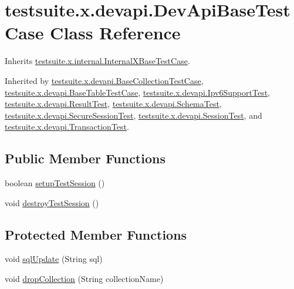 \hypertarget{classtestsuite_1_1x_1_1devapi_1_1_dev_api_base_test_case}{}\section{testsuite.\+x.\+devapi.\+Dev\+Api\+Base\+Test\+Case Class Reference}
\label{classtestsuite_1_1x_1_1devapi_1_1_dev_api_base_test_case}


Inherits \mbox{\hyperlink{classtestsuite_1_1x_1_1internal_1_1_internal_x_base_test_case}{testsuite.\+x.\+internal.\+Internal\+X\+Base\+Test\+Case}}.



Inherited by \mbox{\hyperlink{classtestsuite_1_1x_1_1devapi_1_1_base_collection_test_case}{testsuite.\+x.\+devapi.\+Base\+Collection\+Test\+Case}}, \mbox{\hyperlink{classtestsuite_1_1x_1_1devapi_1_1_base_table_test_case}{testsuite.\+x.\+devapi.\+Base\+Table\+Test\+Case}}, \mbox{\hyperlink{classtestsuite_1_1x_1_1devapi_1_1_ipv6_support_test}{testsuite.\+x.\+devapi.\+Ipv6\+Support\+Test}}, \mbox{\hyperlink{classtestsuite_1_1x_1_1devapi_1_1_result_test}{testsuite.\+x.\+devapi.\+Result\+Test}}, \mbox{\hyperlink{classtestsuite_1_1x_1_1devapi_1_1_schema_test}{testsuite.\+x.\+devapi.\+Schema\+Test}}, \mbox{\hyperlink{classtestsuite_1_1x_1_1devapi_1_1_secure_session_test}{testsuite.\+x.\+devapi.\+Secure\+Session\+Test}}, \mbox{\hyperlink{classtestsuite_1_1x_1_1devapi_1_1_session_test}{testsuite.\+x.\+devapi.\+Session\+Test}}, and \mbox{\hyperlink{classtestsuite_1_1x_1_1devapi_1_1_transaction_test}{testsuite.\+x.\+devapi.\+Transaction\+Test}}.

\subsection*{Public Member Functions}
\begin{DoxyCompactItemize}
\item 
boolean \mbox{\hyperlink{classtestsuite_1_1x_1_1devapi_1_1_dev_api_base_test_case_a086894e5ade506642e1af87a860c1e4f}{setup\+Test\+Session}} ()
\item 
void \mbox{\hyperlink{classtestsuite_1_1x_1_1devapi_1_1_dev_api_base_test_case_af5b2fb8cdedd086eede03f2919c6be5c}{destroy\+Test\+Session}} ()
\end{DoxyCompactItemize}
\subsection*{Protected Member Functions}
\begin{DoxyCompactItemize}
\item 
void \mbox{\hyperlink{classtestsuite_1_1x_1_1devapi_1_1_dev_api_base_test_case_a741b5c92e758ee530cdbab2fb77dce54}{sql\+Update}} (String sql)
\item 
void \mbox{\hyperlink{classtestsuite_1_1x_1_1devapi_1_1_dev_api_base_test_case_a43f5fcbf2c94ba6d3ee1604c96c4ef02}{drop\+Collection}} (String collection\+Name)
\end{DoxyCompactItemize}
